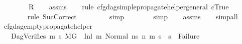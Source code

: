 \begin{isabellebody}
\ \ \ \ \ \ \ \ {\isachardoublequoteopen}R{\isachardoublequoteclose}\isanewline
%
\isadelimproof
\ \ %
\endisadelimproof
%
\isatagproof
{}\isamarkupfalse%
\ assms{\isacharparenleft}{\kern0pt}{}{\isacharminus}{\kern0pt}{}{\isacharparenright}{\kern0pt}\isanewline
\ \ \isamarkupfalse%
\ {\isacharparenleft}{\kern0pt}rule\ cfg{\isacharunderscore}{\kern0pt}dag{\isacharunderscore}{\kern0pt}simple{\isacharunderscore}{\kern0pt}propagate{\isacharunderscore}{\kern0pt}helper{\isacharunderscore}{\kern0pt}general{\isacharbrackleft}{\kern0pt}\ {\isacharquery}{\kern0pt}c{\isacharequal}{\kern0pt}True{\isacharbrackright}{\kern0pt}{\isacharparenright}{\kern0pt}\ \ \isanewline
\ \ \ \ \ \ \isamarkupfalse%
\ {\isacharparenleft}{\kern0pt}rule\ SucCorrect{\isacharparenright}{\kern0pt}\isanewline
\ \ \ \ \ \ \ \isamarkupfalse%
\ simp\isanewline
\ \ \ \ \ \ \isamarkupfalse%
\ simp\isanewline
\ \ \isamarkupfalse%
\ assms{\isacharparenleft}{\kern0pt}{}{\isacharminus}{\kern0pt}{\isacharparenright}{\kern0pt}\isanewline
\ \ \isamarkupfalse%
\ simp{\isacharunderscore}{\kern0pt}all%
\endisatagproof
{\isafoldproof}%
%
\isadelimproof
\isanewline
%
\endisadelimproof
\isanewline
{}\isamarkupfalse%
\ cfg{\isacharunderscore}{\kern0pt}dag{\isacharunderscore}{\kern0pt}empty{\isacharunderscore}{\kern0pt}propagate{\isacharunderscore}{\kern0pt}helper{\isacharcolon}{\kern0pt}\isanewline
\ \ \ DagVerifies{\isacharcolon}{\kern0pt}{\isachardoublequoteopen}{\isasymforall}\ m{}{\isacharprime}{\kern0pt}\ s{}{\isacharprime}{\kern0pt}{\isachardot}{\kern0pt}\ {\isacharparenleft}{\kern0pt}{\isacharparenleft}{\kern0pt}M{\isacharcomma}{\kern0pt}{\isasymLambda}{\isacharcomma}{\kern0pt}{\isasymGamma}{\isacharcomma}{\kern0pt}{\isasymOmega}{\isacharcomma}{\kern0pt}G\ {\isasymturnstile}\ {\isacharparenleft}{\kern0pt}Inl\ m{\isacharcomma}{\kern0pt}\ Normal\ ns{}{\isacharparenright}{\kern0pt}\ {\isacharminus}{\kern0pt}n{\isasymrightarrow}{\isacharasterisk}{\kern0pt}\ {\isacharparenleft}{\kern0pt}m{}{\isacharprime}{\kern0pt}{\isacharcomma}{\kern0pt}\ s{}{\isacharprime}{\kern0pt}{\isacharparenright}{\kern0pt}{\isacharparenright}{\kern0pt}\ {\isasymlongrightarrow}\ {\isacharparenleft}{\kern0pt}s{}{\isacharprime}{\kern0pt}\ {\isasymnoteq}\ Failure{\isacharparenright}{\kern0pt}{\isacharparenright}{\kern0pt}{\isachardoublequoteclose}\ \isanewline

\end{isabellebody}
